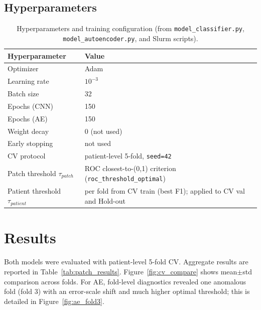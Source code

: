 \documentclass[11pt,a4paper]{article}
\begin{document}
\subsection{Hyperparameters}
\begin{table}[H]
\centering
\begin{tabular}{ll}
\toprule
Hyperparameter & Value \\
\midrule
Optimizer & Adam \\
Learning rate & $10^{-3}$ \\
Batch size & 32 \\
Epochs (CNN) & 150 \\
Epochs (AE) & 150 \\
Weight decay & 0 (not used) \\
Early stopping & not used \\
CV protocol & patient-level 5-fold, \texttt{seed=42} \\
Patch threshold $\tau_{patch}$ & ROC closest-to-(0,1) criterion (\texttt{roc\_threshold\_optimal}) \\
Patient threshold $\tau_{patient}$ & per fold from CV train (best F1); applied to CV val and Hold-out \\
\bottomrule
\end{tabular}
\caption{Hyperparameters and training configuration (from \texttt{model\_classifier.py}, \texttt{model\_autoencoder.py}, and Slurm scripts).}
\label{tab:hparams}
\end{table}

\section{Results}
\label{sec:results}

Both models were evaluated with patient-level 5-fold CV. Aggregate results are reported in Table~\ref{tab:patch_results}. Figure~\ref{fig:cv_compare} shows mean$\pm$std comparison across folds. For AE, fold-level diagnostics revealed one anomalous fold (fold 3) with an error-scale shift and much higher optimal threshold; this is detailed in Figure~\ref{fig:ae_fold3}.
\end{document}

